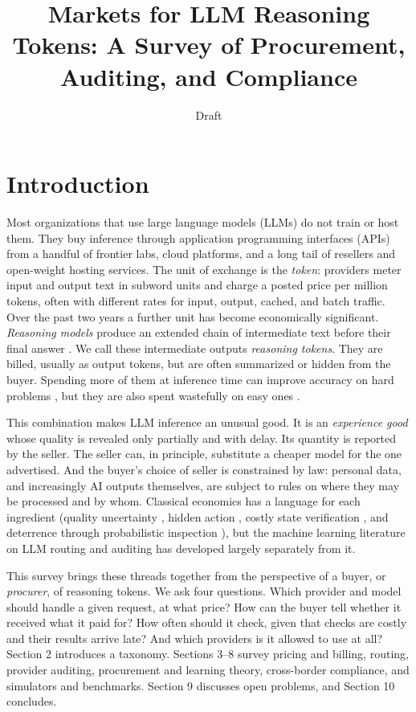 \documentclass[sigconf]{acmart}
\author{Draft}
\title{Markets for LLM Reasoning Tokens: A Survey of Procurement, Auditing, and Compliance}
\begin{document}
\maketitle

\section{Introduction}\label{introduction}

Most organizations that use large language models (LLMs) do not train or host them. They buy inference through application programming interfaces (APIs) from a handful of frontier labs, cloud platforms, and a long tail of resellers and open-weight hosting services. The unit of exchange is the \emph{token}: providers meter input and output text in subword units and charge a posted price per million tokens, often with different rates for input, output, cached, and batch traffic. Over the past two years a further unit has become economically significant. \emph{Reasoning models} produce an extended chain of intermediate text before their final answer \cite{wei2022cot, openai2024o1card, deepseek2025r1}. We call these intermediate outputs \emph{reasoning tokens}. They are billed, usually as output tokens, but are often summarized or hidden from the buyer. Spending more of them at inference time can improve accuracy on hard problems \cite{snell2024scaling}, but they are also spent wastefully on easy ones \cite{chen2024overthinking, han2024tokenbudget}.

This combination makes LLM inference an unusual good. It is an \emph{experience good} whose quality is revealed only partially and with delay. Its quantity is reported by the seller. The seller can, in principle, substitute a cheaper model for the one advertised. And the buyer's choice of seller is constrained by law: personal data, and increasingly AI outputs themselves, are subject to rules on where they may be processed and by whom. Classical economics has a language for each ingredient (quality uncertainty \cite{akerlof1970lemons}, hidden action \cite{holmstrom1979moral}, costly state verification \cite{townsend1979csv}, and deterrence through probabilistic inspection \cite{becker1968crime, avenhaus2002inspection}), but the machine learning literature on LLM routing and auditing has developed largely separately from it.

This survey brings these threads together from the perspective of a buyer, or \emph{procurer}, of reasoning tokens. We ask four questions. Which provider and model should handle a given request, at what price? How can the buyer tell whether it received what it paid for? How often should it check, given that checks are costly and their results arrive late? And which providers is it allowed to use at all? Section 2 introduces a taxonomy. Sections 3--8 survey pricing and billing, routing, provider auditing, procurement and learning theory, cross-border compliance, and simulators and benchmarks. Section 9 discusses open problems, and Section 10 concludes.
\end{document}

